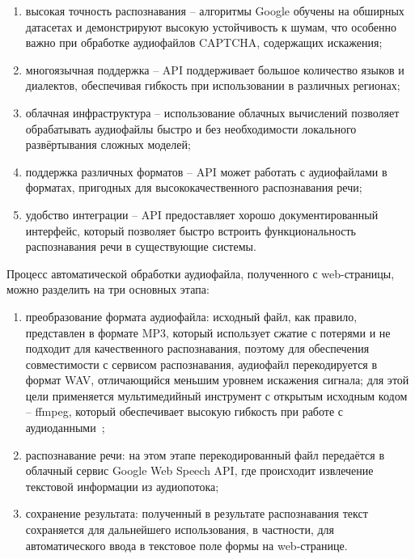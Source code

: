 \begin{enumerate}
    \item высокая точность распознавания -- алгоритмы Google обучены на обширных 
    датасетах и демонстрируют высокую устойчивость к шумам, что особенно 
    важно при обработке аудиофайлов CAPTCHA, содержащих искажения;
    \item многоязычная поддержка -- API поддерживает большое количество языков и 
    диалектов, обеспечивая гибкость при использовании в различных регионах;
    \item облачная инфраструктура -- использование облачных вычислений позволяет 
    обрабатывать аудиофайлы быстро и без необходимости локального развёртывания 
    сложных моделей;
    \item поддержка различных форматов -- API может работать с аудиофайлами в 
    форматах, пригодных для высококачественного распознавания речи;
    \item удобство интеграции -- API предоставляет хорошо документированный 
    интерфейс, который позволяет быстро встроить функциональность распознавания 
    речи в существующие системы.
\end{enumerate}

Процесс автоматической обработки аудиофайла, полученного с web-страницы, можно 
разделить на три основных этапа:

\begin{enumerate}
    \item преобразование формата аудиофайла: исходный файл, как правило, 
    представлен в формате MP3, который использует сжатие с потерями и не подходит 
    для качественного распознавания, поэтому для обеспечения совместимости с 
    сервисом распознавания, аудиофайл перекодируется в формат WAV, отличающийся 
    меньшим уровнем искажения сигнала; для этой цели применяется мультимедийный 
    инструмент с открытым исходным кодом -- ffmpeg, который обеспечивает высокую 
    гибкость при работе с аудиоданными~\cite{ffmpeg};
    \item распознавание речи: на этом этапе перекодированный файл передаётся в 
    облачный сервис Google Web Speech API, где происходит извлечение текстовой 
    информации из аудиопотока;
    \item сохранение результата: полученный в результате распознавания текст 
    сохраняется для дальнейшего использования, в частности, для автоматического 
    ввода в текстовое поле формы на web-странице.
\end{enumerate}

